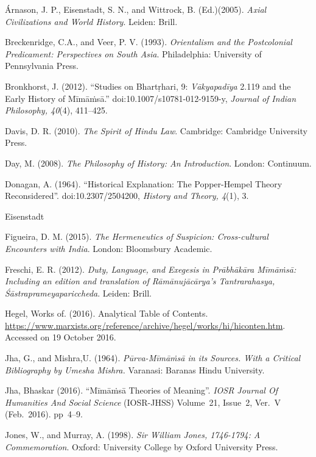 \begin{thebibliography}{99}
\itemsep=2pt
 Árnason, J. P., Eisenstadt, S. N., and Wittrock, B. (Ed.)(2005). \textit{Axial Civilizations and World History}. Leiden: Brill.

  Breckenridge, C.A., and Veer, P. V. (1993). \textit{Orientalism and the Postcolonial Predicament: Perspectives on South Asia}. Philadelphia: University of Pennsylvania Press.

  Bronkhorst, J. (2012). “Studies on Bhartṛhari, 9: \textit{Vākyapadīya} 2.119 and the Early History of Mīmāṁsā.” doi:10.1007/s10781-012-9159-y, \textit{Journal of Indian Philosophy, 40}(4), 411--425.

  Davis, D. R. (2010). \textit{The Spirit of Hindu Law}. Cambridge: Cambridge University Press.

  Day, M. (2008). \textit{The Philosophy of History: An Introduction}. London: Continuum.

  Donagan, A. (1964). “Historical Explanation: The Popper-Hempel Theory Reconsidered”. doi:10.2307/2504200, \textit{History and Theory, 4}(1), 3.

  Eisenstadt

  Figueira, D. M. (2015). \textit{The Hermeneutics of Suspicion: Cross-cultural Encounters with India}. London: Bloomsbury Academic.

  Freschi, E. R. (2012). \textit{Duty, Language, and Exegesis in Prābhākāra Mīmāṁsā: Including an edition and translation of Rāmānujācārya's Tantrarahasya, Śāstraprameyapariccheda}. Leiden: Brill.

  Hegel, Works of. (2016). Analytical Table of Contents. \url{https://www.marxists.org/reference/archive/hegel/works/hi/hiconten.htm}. Accessed on 19 October 2016.

  Jha, G., and Mishra,U. (1964). \textit{Pūrva-Mīmāṁsā in its Sources. With a Critical Bibliography by Umesha Mishra.} Varanasi: Baranas Hindu University.

  Jha, Bhaskar (2016). “Mīmāṁsā Theories of Meaning”. \textit{IOSR Journal Of Humanities And Social Science} (IOSR-JHSS) Volume~21, Issue~2, Ver.~V (Feb.~2016). pp~4--9.

  Jones, W., and Murray, A. (1998). \textit{Sir William Jones, 1746-1794: A Commemoration}. Oxford: University College by Oxford University Press.


\end{thebibliography}
